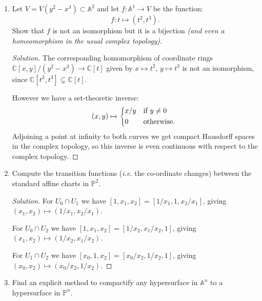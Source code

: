 \documentclass{article}
\theoremstyle{definition}
\renewcommand{\P}{\mathbb{P}}
\newcommand{\A}{\mathbb{A}}
\newcommand{\C}{\mathbb{C}}
\begin{document}
\begin{enumerate}
    \item Let $V=V(y^2-x^3)\subset\A^2$ and let $f:\A^1\to V$ be the function:
        \begin{equation*}
            f:t\mapsto(t^2,t^3).
        \end{equation*}
        Show that $f$ is not an isomorphism but it is a bijection \emph{(and
        even a homeomorphism in the usual complex topology)}.

        \begin{proof}[Solution]
            The corresponding homomorphism of coordinate rings
            $\C[x,y]/(y^2-x^3)\to\C[t]$ given by $x\mapsto t^2$, $y\mapsto t^3$
            is not an isomorphism, since $\C[t^2,t^3]\subsetneq\C[t]$.

            However we have a set-theoretic inverse:
            \begin{equation*}
                (x,y)\mapsto\begin{dcases*}
                    x/y & if $y\ne0$ \\
                    0 & otherwise.
                \end{dcases*}
            \end{equation*}
            Adjoining a point at infinity to both curves we get compact
            Hausdorff spaces in the complex topology, so this inverse is even
            continuous with respect to the complex topology.
        \end{proof}

    \item Compute the transition functions (\emph{i.e.} the co-ordinate changes)
        between the standard affine charts in $\P^2$.

        \begin{proof}[Solution]
            For $U_0\cap U_1$ we have $[1,x_1,x_2]=[1/x_1,1,x_2/x_1]$, giving
            $(x_1,x_2)\mapsto(1/x_1,x_2/x_1)$.

            For $U_0\cap U_2$ we have $[1,x_1,x_2]=[1/x_2,x_1/x_2,1]$, giving
            $(x_1,x_2)\mapsto(1/x_2,x_1/x_2)$.

            For $U_1\cap U_2$ we have $[x_0,1,x_2]=[x_0/x_2,1/x_2,1]$, giving
            $(x_0,x_2)\mapsto(x_0/x_2,1/x_2)$.
        \end{proof}

    \item Find an explicit method to compactify any hypersurface in $\A^n$ to a
        hypersurface in $\P^n$.


\end{enumerate}
\end{document}
